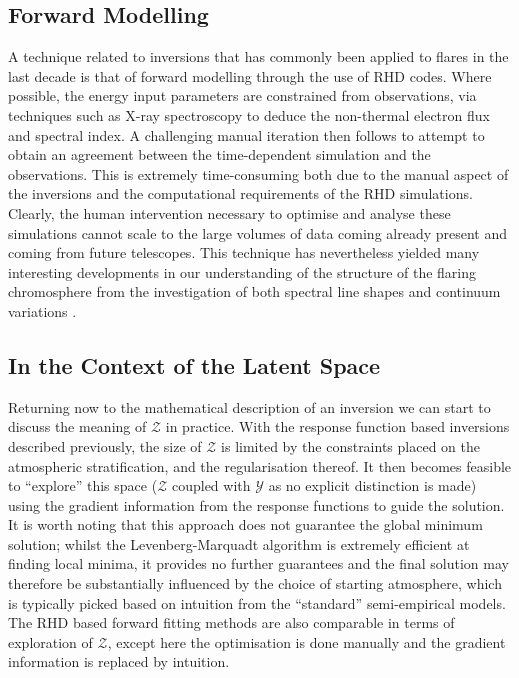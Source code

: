 \subsection{Forward Modelling}

A technique related to inversions that has commonly been applied to flares in the last decade is that of forward modelling through the use of RHD codes.
Where possible, the energy input parameters are constrained from observations, via techniques such as X-ray spectroscopy to deduce the non-thermal electron flux and spectral index.
A challenging manual iteration then follows to attempt to obtain an agreement between the time-dependent simulation and the observations.
This is extremely time-consuming both due to the manual aspect of the inversions and the computational requirements of the RHD simulations.
Clearly, the human intervention necessary to optimise and analyse these simulations cannot scale to the large volumes of data coming already present and coming from future telescopes.
This technique has nevertheless yielded many interesting developments in our understanding of the structure of the flaring chromosphere from the investigation of both spectral line shapes and continuum variations \citep{Kuridze2015,RubioDaCosta2016, Kowalski2017,Simoes2017}.

\subsection{In the Context of the Latent Space}

Returning now to the mathematical description of an inversion we can start to discuss the meaning of $\mathcal{Z}$ in practice.
With the response function based inversions described previously, the size of $\mathcal{Z}$ is limited by the constraints placed on the atmospheric stratification, and the regularisation thereof.
It then becomes feasible to ``explore'' this space ($\mathcal{Z}$ coupled with $\mathcal{Y}$ as no explicit distinction is made) using the gradient information from the response functions to guide the solution.
It is worth noting that this approach does not guarantee the global minimum solution; whilst the Levenberg-Marquadt algorithm is extremely efficient at finding local minima, it provides no further guarantees and the final solution may therefore be substantially influenced by the choice of starting atmosphere, which is typically picked based on intuition from the ``standard'' semi-empirical models.
The RHD based forward fitting methods are also comparable in terms of exploration of $\mathcal{Z}$, except here the optimisation is done manually and the gradient information is replaced by intuition.


